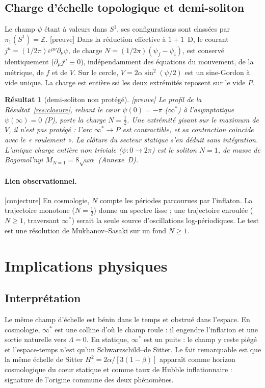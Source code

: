 \documentclass[11pt,a4paper]{article}
\newcommand{\statut}[1]{{\footnotesize\textsf{[#1]}}}
\theoremstyle{plain}
\newtheorem{resultat}{R\'esultat}
\theoremstyle{remark}
\begin{document}
\subsection{Charge d'\'echelle topologique et demi-soliton}
Le champ $\psi$ \'etant \`a valeurs dans $S^1$, ses configurations sont class\'ees par
$\pi_1(S^1)=\mathbb{Z}$. \statut{preuve} Dans la r\'eduction effective \`a $1{+}1$~D, le
courant $j^\mu=(1/2\pi)\varepsilon^{\mu\nu}\partial_\nu\psi$, de charge
$N=(1/2\pi)(\psi_f-\psi_i)$, est conserv\'e identiquement ($\partial_\mu j^\mu\equiv0$),
ind\'ependamment des \'equations du mouvement, de la m\'etrique, de $f$ et de $V$. Sur le
cercle, $V=2\alpha\sin^2(\psi/2)$ est un sine-Gordon \`a vide unique. La charge est
enti\`ere ssi les deux extr\'emit\'es reposent sur le vide $P$.

\begin{resultat}[demi-soliton non prot\'eg\'e]\label{res:topo}
\statut{preuve} Le profil de la R\'esultat~\ref{res:closure}, reliant le c\oe ur
$\psi(0)=-\pi$ ($\infty^*$) \`a l'asymptotique $\psi(\infty)=0$ ($P$), porte la charge
$N=\tfrac12$. Une extr\'emit\'e gisant sur le maximum de $V$, il n'est pas prot\'eg\'e :
l'arc $\infty^*\!\to P$ est contractible, et sa contraction co\"incide avec le
« roulement ». La cl\^oture du secteur statique s'en d\'eduit sans int\'egration. L'unique
charge enti\`ere non triviale ($\psi:0\to2\pi$) est le soliton $N=1$, de masse de
Bogomol'nyi $M_{N=1}=8\sqrt{\omega\alpha}$ (Annexe~D).
\end{resultat}

\paragraph{Lien observationnel.} \statut{conjecture} En cosmologie, $N$ compte les
p\'eriodes parcourues par l'inflaton. La trajectoire monotone ($N=\tfrac12$) donne un
spectre lisse ; une trajectoire enroul\'ee ($N\ge1$, traversant $\infty^*$) serait la seule
source d'oscillations log-p\'eriodiques. Le test est une r\'esolution de Mukhanov--Sasaki
sur un fond $N\ge1$.

\section{Implications physiques}
\subsection{Interpr\'etation}
Le m\^eme champ d'\'echelle est b\'enin dans le temps et obstru\'e dans l'espace. En
cosmologie, $\infty^*$ est une colline d'o\`u le champ roule : il engendre l'inflation et
une sortie naturelle vers $\Lambda=0$. En statique, $\infty^*$ est un puits : le champ y
reste pi\'eg\'e et l'espace-temps n'est qu'un Schwarzschild--de Sitter. Le fait remarquable
est que la m\^eme \'echelle de Sitter $H^2=2\alpha/[3(1-\beta)]$ appara\^it comme horizon
cosmologique du c\oe ur statique et comme taux de Hubble inflationnaire : signature de
l'origine commune des deux ph\'enom\`enes.
\end{document}
